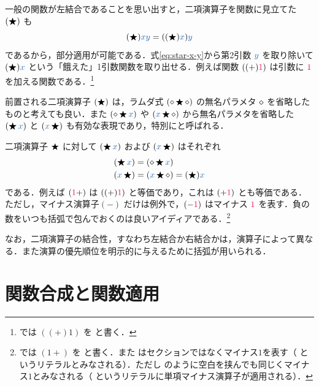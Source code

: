 \documentclass[a5paper,twoside,fleqn,draft]{jsbook}
\begin{document}
一般の関数が左結合であることを思い出すと，二項演算子を関数に見立てた
$(\operatorname{\bigstar})$ も
\begin{equation}
  \label{eq:star-x-y}
  (\hAnyBinOp)\hVar{x}\hVar{y}
  =((\hAnyBinOp)\hVar{x})\hVar{y}
\end{equation}
であるから，部分適用が可能である．式\eqref{eq:star-x-y}から第2引数 $\hVar{y}$ を取り除いて $(\hAnyBinOp)\hVar{x}$ という「餓えた」1引数関数を取り出せる．例えば関数 $((+)\hConstant{1})$ は引数に $\hConstant{1}$ を加える関数である．\footnote{\haskell では $((+)1)$ を  と書く．}

\separator

前置される二項演算子 $(\operatorname{\bigstar})$ は，ラムダ式 $(\diamond\operatorname{\bigstar}\diamond)$ の無名パラメタ $\diamond$ を省略したものと考えても良い．また $(\hAnonParam\hAnyBinOp\hVar{x})$ や $(\hVar{x}\hAnyBinOp\hAnonParam)$ から無名パラメタを省略した $(\hAnyBinOp\hVar{x})$ と $(\hVar{x}\hAnyBinOp)$ も有効な表現であり，特別にと呼ばれる．

二項演算子 $\operatorname{\bigstar}$ に対して $(\hAnyBinOp\hVar{x})$ および $(\hVar{x}\hAnyBinOp)$ はそれぞれ
\begin{align}
  (\hAnyBinOp\hVar{x})
  &=(\hAnonParam\hAnyBinOp\hVar{x})\\
  (\hVar{x}\hAnyBinOp)
  &=(\hVar{x}\hAnyBinOp\hAnonParam)=(\hAnyBinOp)\hVar{x}
\end{align}
である．例えば $(\hConstant{1}+)$ は $((+)\hConstant{1})$ と等価であり，これは $(+\hConstant{1})$ とも等価である．ただし，マイナス演算子$(-)$ だけは例外で，$(-\hConstant{1})$ はマイナス $\hConstant{1}$ を表す．負の数をいつも括弧で包んでおくのは良いアイディアである．\footnote{\haskell では $(1+)$ を と書く．また  はセクションではなくマイナス$1$を表す（ というリテラルとみなされる）．ただし のように空白を挟んでも同じくマイナス$1$とみなされる（ というリテラルに単項マイナス演算子が適用される）．}

なお，二項演算子の結合性，すなわち左結合か右結合かは，演算子によって異なる．また演算の優先順位を明示的に与えるために括弧が用いられる．

\section{関数合成と関数適用}
\end{document}
